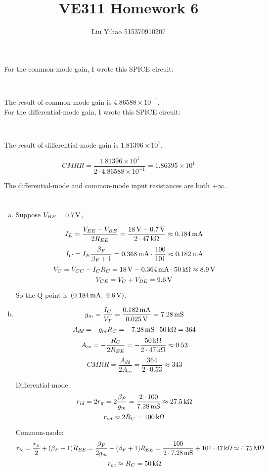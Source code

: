 \documentclass{article}
\title{VE311 Homework 6}
\author{Liu Yihao 515370910207}
\date{}
\newcommand{\inputmintedindent}[2]{
\begin{minipage}{0.1\linewidth}\end{minipage}
\begin{minipage}{0.85\linewidth}\inputminted{#1}{#2}\end{minipage}\\[0.5em]
}
\newcommand{\unit}[1]{{\rm\,#1}}
\begin{document}
\maketitle

\section{}

For the common-mode gain, I wrote this SPICE circuit: \\

\inputmintedindent{v}{p1_1.cir}

The result of common-mode gain is $4.86588\times10^{-1}$. \\

For the differential-mode gain, I wrote this SPICE circuit: \\

\inputmintedindent{v}{p1_2.cir}

The result of differential-mode gain is $1.81396\times10^{1}$. 

$$CMRR = \frac{1.81396\times10^{1}}{2\cdot 4.86588\times10^{-1}} = 1.86395\times10^{1}$$

The differential-mode and common-mode input resistances are both $+\infty$.\\


\section{}

\begin{enumerate}[(a)]
\item
Suppose $V_{BE}=0.7\unit{V}$,

$$I_E=\frac{V_{EE}-V_{BE}}{2R_{EE}}=\frac{18\unit{V}-0.7\unit{V}}{2\cdot47\unit{k\Omega}}\approx0.184\unit{mA}$$
$$I_C=I_E\frac{\beta_F}{\beta_F+1}=0.368\unit{mA}\cdot\frac{100}{101}\approx0.182\unit{mA}$$
$$V_{C}=V_{CC}-I_CR_C=18\unit{V}-0.364\unit{mA}\cdot50\unit{k\Omega}\approx8.9\unit{V}$$
$$V_{CE}=V_{C}+V_{BE}=9.6\unit{V}$$

So the Q point is $(0.184\unit{mA},\ 9.6\unit{V})$.
\item
$$g_m=\frac{I_C}{V_T}=\frac{0.182\unit{mA}}{0.025\unit{V}}=7.28\unit{mS}$$
$$A_{dd}=-g_mR_C=-7.28\unit{mS}\cdot50\unit{k\Omega}=364$$
$$A_{cc}=-\frac{R_C}{2R_{EE}}=-\frac{50\unit{k\Omega}}{2\cdot47\unit{k\Omega}}\approx0.53$$
$$CMRR = \frac{A_{dd}}{2A_{cc}} = \frac{364}{2\cdot 0.53} \approx 343$$

Differential-mode:
$$r_{id}=2r_{\pi}=2\frac{\beta_F}{g_m}=\frac{2\cdot100}{7.28\unit{mS}}\approx27.5\unit{k\Omega}$$
$$r_{od}\approx 2R_C=100\unit{k\Omega}$$

Common-mode:
$$r_{ic}=\frac{r_{\pi}}{2}+(\beta_F+1)R_{EE}=\frac{\beta_F}{2g_m}+(\beta_F+1)R_{EE}=\frac{100}{2\cdot7.28\unit{mS}}+101\cdot47\unit{k\Omega}\approx4.75\unit{M\Omega}$$
$$r_{oc}\approx R_C=50\unit{k\Omega}$$

\end{enumerate}
\end{document}
